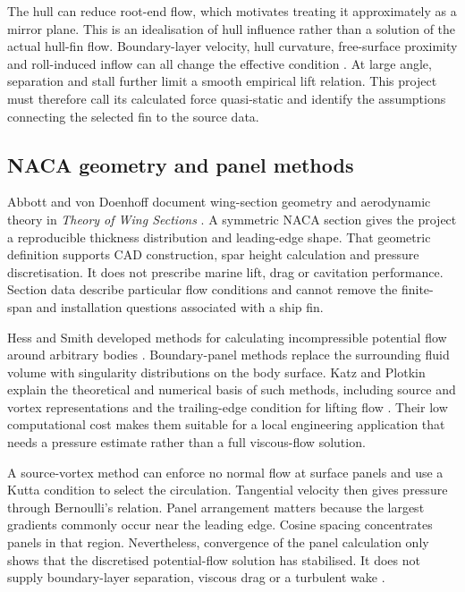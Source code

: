 The hull can reduce root-end flow, which motivates treating it approximately as a mirror plane. This is an idealisation of hull influence rather than a solution of the actual hull-fin flow. Boundary-layer velocity, hull curvature, free-surface proximity and roll-induced inflow can all change the effective condition \cite{molland2007}. At large angle, separation and stall further limit a smooth empirical lift relation. This project must therefore call its calculated force quasi-static and identify the assumptions connecting the selected fin to the source data.

\subsection{NACA geometry and panel methods}
\label{sec:lit-panels}

Abbott and von Doenhoff document wing-section geometry and aerodynamic theory in \emph{Theory of Wing Sections} \cite{abbott1959}. A symmetric NACA section gives the project a reproducible thickness distribution and leading-edge shape. That geometric definition supports CAD construction, spar height calculation and pressure discretisation. It does not prescribe marine lift, drag or cavitation performance. Section data describe particular flow conditions and cannot remove the finite-span and installation questions associated with a ship fin.

Hess and Smith developed methods for calculating incompressible potential flow around arbitrary bodies \cite{hess1967}. Boundary-panel methods replace the surrounding fluid volume with singularity distributions on the body surface. Katz and Plotkin explain the theoretical and numerical basis of such methods, including source and vortex representations and the trailing-edge condition for lifting flow \cite{katz2001}. Their low computational cost makes them suitable for a local engineering application that needs a pressure estimate rather than a full viscous-flow solution.

A source-vortex method can enforce no normal flow at surface panels and use a Kutta condition to select the circulation. Tangential velocity then gives pressure through Bernoulli's relation. Panel arrangement matters because the largest gradients commonly occur near the leading edge. Cosine spacing concentrates panels in that region. Nevertheless, convergence of the panel calculation only shows that the discretised potential-flow solution has stabilised. It does not supply boundary-layer separation, viscous drag or a turbulent wake \cite{hess1967,katz2001}.

